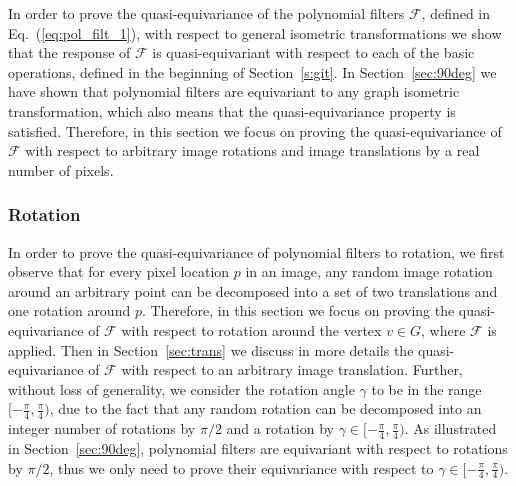 \documentclass[10pt,journal,compsoc]{IEEEtran}
\newcommand{\renata}[1]{\textcolor{black}{#1}}
\newcommand{\mF}{\mathcal{F}}
\begin{document}


In order to prove the quasi-equivariance of the polynomial filters $\mathcal{F}$, defined in  Eq.~(\ref{eq:pol_filt_1}), with respect to general isometric transformations we show that the response of $\mathcal{F}$ is quasi-equivariant with respect to each of the basic operations, defined in the beginning of Section~\ref{s:git}. In Section~\ref{sec:90deg} we have shown that polynomial filters are equivariant to any graph isometric transformation, which also means that the quasi-equivariance property is satisfied. Therefore, in this section we focus on proving the quasi-equivariance of $\mathcal{F}$ with respect to arbitrary image rotations and image translations by a real number of pixels.






	\subsubsection{Rotation}
	\label{sec:rot}

In order to prove the quasi-equivariance of polynomial filters to rotation, we first observe that for every pixel location $p$ in an image, any random image rotation around an arbitrary point can be decomposed into a set of two translations and one rotation around $p$. Therefore, in this section we focus on proving the quasi-equivariance of $\mF$ with respect to rotation around the vertex $v \in G$, where $\mF$ is applied. Then in Section~\ref{sec:trans} we discuss in more details the quasi-equivariance of $\mF$ with respect to an arbitrary image translation. Further, without loss of generality, we consider the rotation angle $\gamma$ to be in the range $[-\frac{\pi}{4},\frac{\pi}{4})$, due to the fact that any random rotation can be decomposed into an integer number of rotations by $\pi/2$ and a rotation by $\gamma \in [-\frac{\pi}{4},\frac{\pi}{4})$. As illustrated in Section~\ref{sec:90deg}, polynomial filters are equivariant with respect to rotations by $\pi/2$, thus we only need to prove their equivariance with respect to $\gamma \in [-\frac{\pi}{4},\frac{\pi}{4})$.
\end{document}
